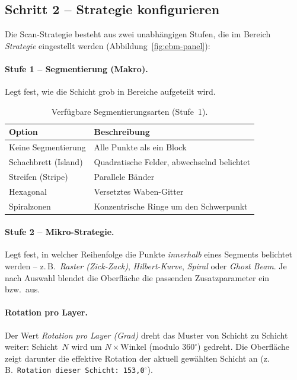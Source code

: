 \subsection{Schritt 2 -- Strategie konfigurieren}
\label{subsec:ebm-strategy}

Die Scan-Strategie besteht aus zwei unabhängigen Stufen, die im Bereich
\emph{Strategie} eingestellt werden (Abbildung~\ref{fig:ebm-panel}):

\paragraph{Stufe 1 -- Segmentierung (Makro).}
Legt fest, wie die Schicht grob in Bereiche aufgeteilt wird.

\begin{table}[H]
  \centering
  \begin{tabular}{@{}ll@{}}
    \toprule
    \textbf{Option} & \textbf{Beschreibung} \\
    \midrule
    Keine Segmentierung      & Alle Punkte als ein Block \\
    Schachbrett (Island)     & Quadratische Felder, abwechselnd belichtet \\
    Streifen (Stripe)        & Parallele Bänder \\
    Hexagonal                & Versetztes Waben-Gitter \\
    Spiralzonen              & Konzentrische Ringe um den Schwerpunkt \\
    \bottomrule
  \end{tabular}
  \caption{Verfügbare Segmentierungsarten (Stufe~1).}
  \label{tab:ebm-seg}
\end{table}

\paragraph{Stufe 2 -- Mikro-Strategie.}
Legt fest, in welcher Reihenfolge die Punkte \emph{innerhalb} eines Segments
belichtet werden -- z.\,B.\ \emph{Raster (Zick-Zack)},
\emph{Hilbert-Kurve}, \emph{Spiral} oder \emph{Ghost Beam}. Je nach Auswahl
blendet die Oberfläche die passenden Zusatzparameter ein bzw.\ aus.

\paragraph{Rotation pro Layer.}
Der Wert \emph{Rotation pro Layer (Grad)} dreht das Muster von Schicht zu
Schicht weiter: Schicht~$N$ wird um $N \times \mathrm{Winkel}$ (modulo
$360^\circ$) gedreht. Die Oberfläche zeigt darunter die effektive Rotation der
aktuell gewählten Schicht an (z.\,B.\ \texttt{Rotation dieser Schicht: 153{,}0$^\circ$}).

